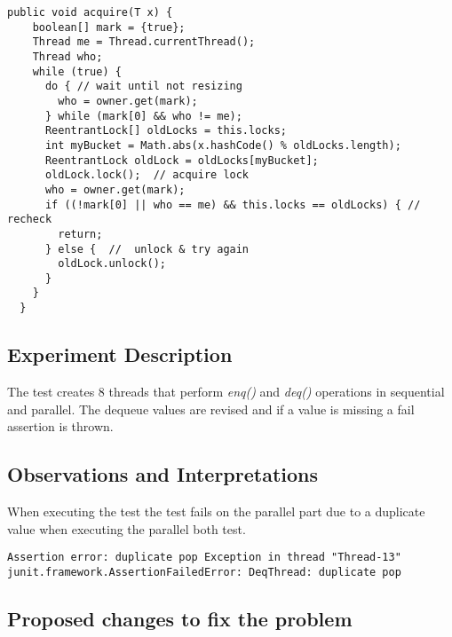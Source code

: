 \begin{lstlisting}[frame=single,breaklines=true]
  public void acquire(T x) {
    boolean[] mark = {true};
    Thread me = Thread.currentThread();
    Thread who;
    while (true) {
      do { // wait until not resizing
        who = owner.get(mark);
      } while (mark[0] && who != me);
      ReentrantLock[] oldLocks = this.locks;
      int myBucket = Math.abs(x.hashCode() % oldLocks.length);
      ReentrantLock oldLock = oldLocks[myBucket];
      oldLock.lock();  // acquire lock
      who = owner.get(mark);
      if ((!mark[0] || who == me) && this.locks == oldLocks) { // recheck
        return;
      } else {  //  unlock & try again
        oldLock.unlock();
      }
    }
  }
\end{lstlisting}
\par



\subsection{Experiment Description} 
\par
The test creates $8$ threads that perform \textit{enq()} and \textit{deq()} operations in sequential and parallel.
The dequeue values are revised and if a value is missing a fail assertion is thrown.
\par


\subsection{Observations and Interpretations}

\par
When executing the test the test fails on the parallel part due to a duplicate value when executing the parallel both test.
\begin{lstlisting}[frame=single,breaklines=true]
Assertion error: duplicate pop Exception in thread "Thread-13" junit.framework.AssertionFailedError: DeqThread: duplicate pop

\end{lstlisting}



\subsection{Proposed changes to fix the problem}

